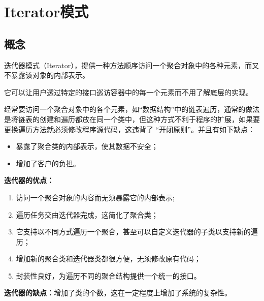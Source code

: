 \chapter{Iterator模式}
\section{概念}
迭代器模式（Iterator），提供一种方法顺序访问一个聚合对象中的各种元素，而又不暴露该对象的内部表示。
\par 它可以让用户透过特定的接口巡访容器中的每一个元素而不用了解底层的实现。
\par 经常要访问一个聚合对象中的各个元素，如“数据结构”中的链表遍历，通常的做法是将链表的创建和遍历都放在同一个类中，但这种方式不利于程序的扩展，如果要更换遍历方法就必须修改程序源代码，这违背了 “开闭原则”。并且有如下缺点：
\begin{itemize}
	\item 暴露了聚合类的内部表示，使其数据不安全；
	\item 增加了客户的负担。
\end{itemize}
\textbf{迭代器的优点：}
\begin{enumerate}
	\item 访问一个聚合对象的内容而无须暴露它的内部表示;
	\item 遍历任务交由迭代器完成，这简化了聚合类；
	\item 它支持以不同方式遍历一个聚合，甚至可以自定义迭代器的子类以支持新的遍历；
	\item 增加新的聚合类和迭代器类都很方便，无须修改原有代码；
	\item 封装性良好，为遍历不同的聚合结构提供一个统一的接口。
\end{enumerate}
\textbf{迭代器的缺点：}增加了类的个数，这在一定程度上增加了系统的复杂性。
